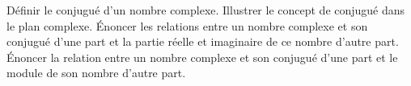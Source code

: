 %
%
	\begin{tasks}
		\task Définir le conjugué d'un nombre complexe.
		\task Illustrer le concept de conjugué dans le plan complexe.
		\task Énoncer les relations entre un nombre complexe et son conjugué d'une part et la partie réelle et imaginaire de ce nombre d'autre part.
		\task Énoncer la relation entre un nombre complexe et son conjugué d'une part et le module de son nombre d'autre part.
	\end{tasks}
